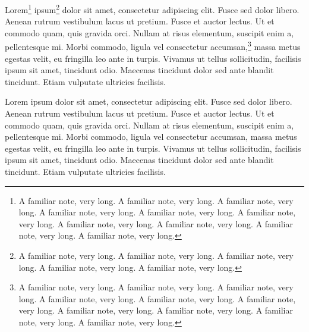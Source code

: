 \documentclass{book}
\begin{document}
Lorem\footnote{A familiar note, very long. A familiar note, very long. A familiar note, very long. A familiar note, very long. A familiar note, very long. A familiar note, very long. A familiar note, very long. A familiar note, very long. A familiar note, very long. A familiar note, very long.} ipsum\footnote{A familiar note, very long. A familiar note, very long. A familiar note, very long. A familiar note, very long. A familiar note, very long.} dolor sit amet, consectetur adipiscing elit. Fusce sed dolor libero. Aenean rutrum vestibulum lacus ut pretium. Fusce et auctor lectus. Ut et commodo quam, quis gravida orci. Nullam at risus elementum, suscipit enim a, pellentesque mi.
Morbi commodo, ligula vel consectetur accumsan,\footnote{A familiar note, very long. A familiar note, very long. A familiar note, very long. A familiar note, very long. A familiar note, very long. A familiar note, very long. A familiar note, very long. A familiar note, very long. A familiar note, very long. A familiar note, very long.} massa metus egestas velit, eu fringilla leo ante in turpis. Vivamus ut tellus sollicitudin, facilisis ipsum sit amet, tincidunt odio. Maecenas tincidunt dolor sed ante blandit tincidunt. Etiam vulputate ultricies facilisis.



\newpage

\beginnumbering
\pstart
Lorem ipsum dolor sit amet, consectetur adipiscing elit. Fusce sed dolor libero. Aenean rutrum vestibulum lacus ut pretium. Fusce et auctor lectus. Ut et commodo quam, quis gravida orci. Nullam at risus elementum, suscipit enim a, pellentesque mi.
Morbi commodo, ligula vel consectetur accumsan, massa metus egestas velit, eu fringilla leo ante in turpis. Vivamus ut tellus sollicitudin, facilisis ipsum sit amet, tincidunt odio. Maecenas tincidunt dolor sed ante blandit tincidunt. Etiam vulputate ultricies facilisis.
\pend
\endnumbering
\end{document}
